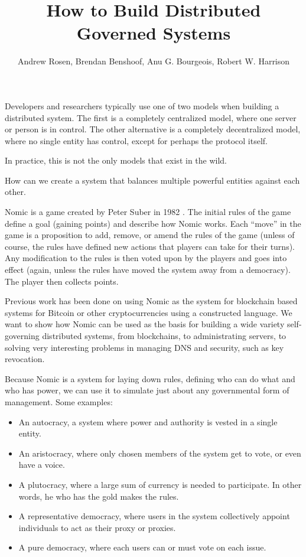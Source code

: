 \documentclass[11pt,letterpaper]{article}
\author{Andrew Rosen, Brendan Benshoof, Anu G. Bourgeois, Robert W. Harrison}
\date{}
\title{How to Build Distributed Governed Systems}
\begin{document}
	\maketitle
	
	
	Developers and researchers typically use one of two models when building a distributed system.
	The first is a completely centralized model, where one server or person is in control.
	The other alternative is a completely decentralized model, where no single entity has control, except for perhaps the protocol itself.
	
	In practice, this is not the only models that exist in the wild.  
	
	
	How can we create a system that balances multiple powerful entities against each other.
	
	
	
	Nomic is a game created by Peter Suber in 1982 \cite{nomic}.
	The initial rules of the game define a goal (gaining points) and describe how Nomic works.
	Each ``move'' in the game is a proposition to add, remove, or amend the rules of the game (unless of course, the rules have defined new actions that players can take for their turns).
	Any modification to the rules is then voted upon by the players and goes into effect (again, unless the rules have moved the system away from a democracy).
	The player then collects points.
	
	Previous work has been done on using Nomic as the system for blockchain based systems for Bitcoin or other cryptocurrencies \cite{tezos} using a constructed language.
	We want to show how Nomic can be used as the basis for building a wide variety self-governing distributed systems, from blockchains, to administrating servers, to solving very interesting problems in managing DNS and security, such as key revocation.
	
	Because Nomic is a system for laying down rules, defining who can do what and who has power, we can use it to simulate just about any governmental form of management. 
	Some examples:
	\begin{itemize}
		\item An autocracy, a system where power and authority is vested in a single entity. 
		\item An aristocracy, where only chosen members of the system get to vote, or even have a voice.
		\item A plutocracy, where a large sum of currency is needed to participate. In other words, he who has the gold makes the rules.
		\item A representative democracy, where users in the system collectively appoint individuals to act as their proxy or proxies.
		\item A pure democracy, where each users can or must vote on each issue.
	\end{itemize}
	
\end{document}
